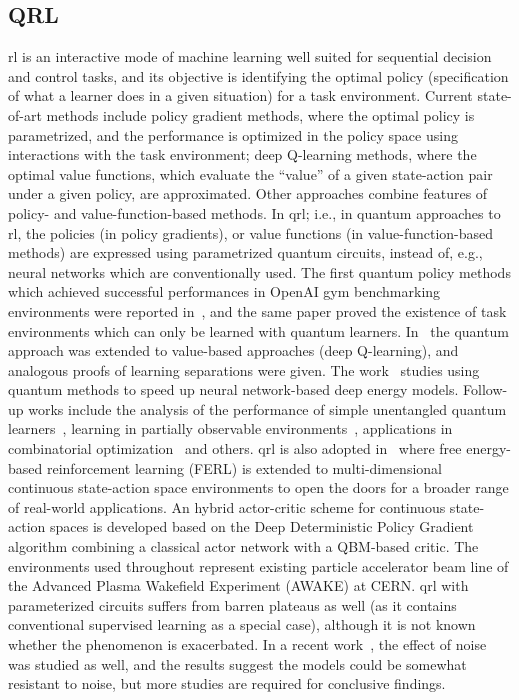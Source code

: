 \subsection{QRL}	

\gls{rl} is an interactive mode of machine learning well suited for sequential decision and control tasks, and its objective is identifying the optimal policy (specification of what a learner does in a given situation) for a task environment. Current state-of-art methods include policy gradient methods, where the optimal policy is parametrized, and the performance is optimized in the policy space using interactions with the task environment; deep Q-learning methods, where the optimal value functions, which evaluate the ``value'' of a given state-action pair under a given policy, are approximated. Other approaches combine features of policy- and value-function-based methods.
In \gls{qrl}; i.e., in quantum approaches to \gls{rl}, the policies (in policy gradients), or value functions (in value-function-based methods) are expressed using parametrized quantum circuits, instead of, e.g., neural networks which are conventionally used.
The first quantum policy methods which achieved successful performances in OpenAI gym benchmarking environments were reported in~\cite{JerbiNEURIPS2021}, and the same paper proved the existence of task environments which can only be learned with quantum learners. In~\cite{SkolikQuantum2022} the quantum approach was extended to value-based approaches (deep Q-learning), and analogous proofs of learning separations were given.
The work~\cite{JerbiPRXQ2021} studies using quantum methods to speed up neural network-based deep energy models.
Follow-up works include the analysis of the performance of simple unentangled quantum learners~\cite{hsiao2022unentangled}, learning in partially observable environments~\cite{chen2022quantum}, applications in combinatorial optimization~\cite{skolik2022equivariant} and others. 
\gls{qrl} is also adopted in~\cite{schenk2022hybrid} where free energy-based reinforcement learning (FERL) is extended to multi-dimensional continuous state-action space environments to open the doors for a broader range of real-world applications.
An hybrid actor-critic scheme for continuous state-action spaces is developed based on the Deep Deterministic Policy Gradient algorithm combining a classical actor network with a QBM-based critic. The environments used throughout represent existing particle accelerator beam line of the Advanced Plasma Wakefield Experiment (AWAKE) at CERN.
\gls{qrl} with parameterized circuits suffers from barren plateaus as well (as it contains conventional supervised learning as a special case), although it is not known whether the phenomenon is exacerbated. In a recent work~\cite{skolik2022robustness}, the effect of noise was studied as well, and the results suggest the models could be somewhat resistant to noise, but more studies are required for conclusive findings.

